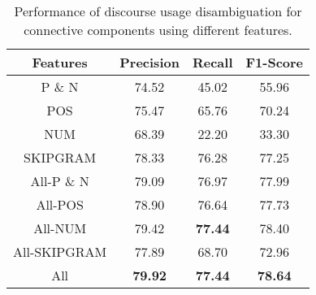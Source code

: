 \begin{table}[ht]
\centering
\begin{tabular}{|c|c|c|c|}
\hline

\bf Features        & \bf Precision & \bf Recall & \bf F1-Score \\ \hline
    P \& N          &     74.52     &     45.02  &     55.96    \\ \hline
    POS             &     75.47     &     65.76  &     70.24    \\ \hline
    NUM             &     68.39     &     22.20  &     33.30    \\ \hline
    SKIPGRAM        &     78.33     &     76.28  &     77.25    \\ \hline
    All-P \& N      &     79.09     &     76.97  &     77.99    \\ \hline
    All-POS         &     78.90     &     76.64  &     77.73    \\ \hline
    All-NUM         &     79.42     & \bf 77.44  &     78.40    \\ \hline
    All-SKIPGRAM    &     77.89     &     68.70  &     72.96    \\ \hline
    All             & \bf 79.92     & \bf 77.44  & \bf 78.64    \\ \hline

\end{tabular}
\caption{\label{t:recognition-features} Performance of discourse usage
disambiguation for connective components using different features. }
\end{table}
